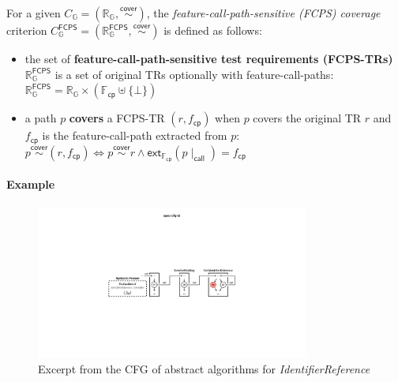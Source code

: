 \documentclass[acmsmall,review,screen]{acmart}
\newcommand{\name}[1]{\textsf{#1}}
\newcommand{\esnt}[1]{\textit{\color{esnt}#1}}
\newcommand{\graph}{\mathbb{G}}
\newcommand{\pat}{p}
\newcommand{\cover}{\overset{\name{cover}}{\sim}}
\newcommand{\trset}[1]{\mathbb{R}_{#1}}
\newcommand{\tr}{r}
\newcommand{\cov}[1]{C_{#1}}
\newcommand{\featset}{\mathbb{F}}
\newcommand{\feat}{f}
\newcommand{\css}[1]{{#1}\!\mid_{\name{call}}}
\newcommand{\fcpset}{\featset_\name{cp}}
\newcommand{\fcp}{\feat_\name{cp}}
\newcommand{\extfcp}{\name{ext}_{\fcpset}}
\newcommand{\fcpcov}[1]{\cov{#1}^{\name{FCPS}}}
\newcommand{\fcptrset}[1]{\trset{#1}^{\name{FCPS}}}
\begin{document}
\begin{definition}\label{def:fcps-cov}
  For a given $\cov{\graph} = (\trset{\graph}, \cover)$, the
  \textit{feature-call-path-sensitive (FCPS) coverage} criterion $\fcpcov{\graph}
  = (\fcptrset{\graph}, \cover)$ is defined as follows:
  \begin{itemize}
    \item the set of \textbf{feature-call-path-sensitive test requirements
      (FCPS-TRs)} $\fcptrset{\graph}$ is a set of original TRs optionally with
      feature-call-paths:
$
        \fcptrset{\graph} = \trset{\graph} \times (\fcpset \uplus \{ \bot \})
$
    \item a path $\pat$ \textbf{covers} a FCPS-TR $(\tr, \fcp)$ when $\pat$
      covers the original TR $\tr$ and $\fcp$ is the feature-call-path extracted
      from $\pat$:
$
        \pat \cover (\tr, \fcp) \iff \pat \cover \tr \wedge
        \extfcp(\css{\pat}) = \fcp
$
  \end{itemize}
\end{definition}


\paragraph{\textbf{Example}}

\begin{figure}
  \includegraphics[width=0.8\textwidth]{img/spec-cfg-id}
\vspace*{-.5em}
  \caption{
Excerpt from the CFG of abstract algorithms for \esnt{IdentifierReference}
  }
  \label{fig:spec-cfg-id}
\vspace*{-1em}
\end{figure}
\end{document}
